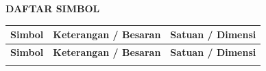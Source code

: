 
\clearpage
{}
\pagestyle{frontstyle}

\begin{center}
    {\fontsize{14pt}{18pt}\selectfont \bfseries DAFTAR SIMBOL}
\end{center}

\vspace{0.5cm}

\noindent\begin{longtable}{|>{\centering\arraybackslash}p{2.4cm}|>{\raggedright\arraybackslash}p{8.0cm}|>{\centering\arraybackslash}p{2.6cm}|}
    \hline
    \rowcolor[gray]{0.85}
    \textbf{Simbol} & \textbf{Keterangan / Besaran} & \textbf{Satuan / Dimensi} \\
    \hline
    \endfirsthead
    \hline
    \rowcolor[gray]{0.85}
    \textbf{Simbol} & \textbf{Keterangan / Besaran} & \textbf{Satuan / Dimensi} \\
    \hline
    \endhead
    \hline
    \endfoot


\end{longtable}
